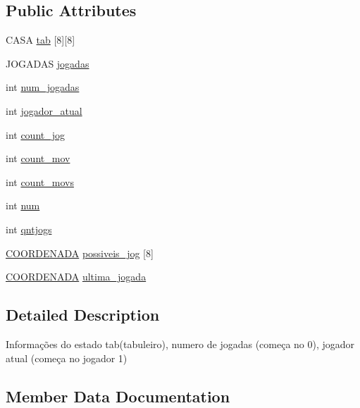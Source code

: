 \subsection*{Public Attributes}
\begin{DoxyCompactItemize}
\item 
C\+A\+SA \hyperlink{structESTADO_ab56f0f1be16954d3768b4174d14c087d}{tab} \mbox{[}8\mbox{]}\mbox{[}8\mbox{]}
\item 
J\+O\+G\+A\+D\+AS \hyperlink{structESTADO_afae43b87a488fad0f2b56a18bad31d18}{jogadas}
\item 
int \hyperlink{structESTADO_a261495728744647e618b4e623f5a4b7a}{num\+\_\+jogadas}
\item 
int \hyperlink{structESTADO_a5dd28e2e68b7aef2b6b7ea88e02eff58}{jogador\+\_\+atual}
\item 
int \hyperlink{structESTADO_a5632721fdfcc6c98f084c91aef5b6e25}{count\+\_\+jog}
\item 
int \hyperlink{structESTADO_a36e8d21ac156e82ce914ccdafc6796ea}{count\+\_\+mov}
\item 
int \hyperlink{structESTADO_a49b04d6940f820509146c9162ac10542}{count\+\_\+movs}
\item 
int \hyperlink{structESTADO_a248a8554633b7e8e40142e5b8c4e6960}{num}
\item 
int \hyperlink{structESTADO_ae0aaae1dc17799598305cd40a3ca2ba8}{qntjogs}
\item 
\hyperlink{structCOORDENADA}{C\+O\+O\+R\+D\+E\+N\+A\+DA} \hyperlink{structESTADO_ab9b11998a54bde459f72cbbc32e79b0b}{possiveis\+\_\+jog} \mbox{[}8\mbox{]}
\item 
\hyperlink{structCOORDENADA}{C\+O\+O\+R\+D\+E\+N\+A\+DA} \hyperlink{structESTADO_a4896a5c5c1f40b43fb795623327e3f47}{ultima\+\_\+jogada}
\end{DoxyCompactItemize}


\subsection{Detailed Description}
Informações do estado tab(tabuleiro), numero de jogadas (começa no 0), jogador atual (começa no jogador 1) 

\subsection{Member Data Documentation}
\mbox{\label{structESTADO_a5632721fdfcc6c98f084c91aef5b6e25}} 
